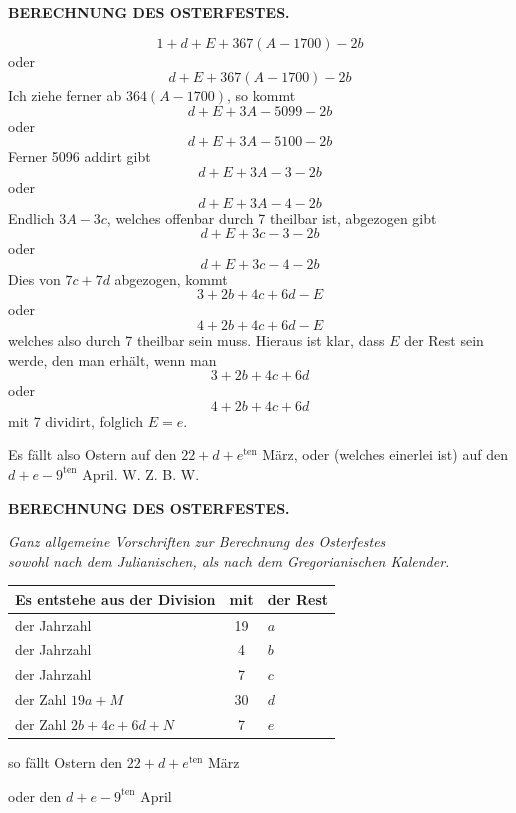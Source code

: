 \par\clearpage
\begingroup
\pagestyle{empty}
\setlength{\abovedisplayskip}{6pt plus 2pt minus 2pt}
\setlength{\belowdisplayskip}{6pt plus 2pt minus 2pt}
\setlength{\abovedisplayshortskip}{3pt plus 2pt}
\setlength{\belowdisplayshortskip}{4pt plus 2pt minus 1pt}
\thispagestyle{empty}
\noindent{}%
\makebox[12mm][l]{}%
\parbox[t]{\dimexpr\linewidth-24mm\relax}{\centering\footnotesize\bfseries BERECHNUNG DES OSTERFESTES.\par}%
\par\nobreak\medskip
\[
1+d+E+367(A-1700)-2b
\]
oder
\[
d+E+367(A-1700)-2b
\]
Ich ziehe ferner ab $364(A-1700)$, so kommt
\[
d+E+3A-5099-2b
\]
oder
\[
d+E+3A-5100-2b
\]
Ferner 5096 addirt gibt
\[
d+E+3A-3-2b
\]
oder
\[
d+E+3A-4-2b
\]
Endlich $3A-3c$, welches offenbar durch 7 theilbar ist, abgezogen gibt
\[
d+E+3c-3-2b
\]
oder
\[
d+E+3c-4-2b
\]
Dies von $7c+7d$ abgezogen, kommt
\[
3+2b+4c+6d-E
\]
oder
\[
4+2b+4c+6d-E
\]
welches also durch 7 theilbar sein muss. Hieraus ist klar, dass $E$ der Rest
sein werde, den man erhält, wenn man
\[
3+2b+4c+6d
\]
oder
\[
4+2b+4c+6d
\]
mit 7 dividirt, folglich $E=e$.

Es fällt also Ostern auf den $22+d+e^{\mathrm{ten}}$ März, oder (welches einerlei ist)
auf den $d+e-9^{\mathrm{ten}}$ April. W. Z. B. W.

\par\clearpage
\thispagestyle{empty}
\noindent{}%
%
\parbox[t]{\dimexpr\linewidth-24mm\relax}{\centering\footnotesize\bfseries BERECHNUNG DES OSTERFESTES.\par}%
\makebox[12mm][r]{}\par\nobreak\medskip
\begin{center}
\itshape Ganz allgemeine Vorschriften zur Berechnung des Osterfestes\\
sowohl nach dem Julianischen, als nach dem Gregorianischen Kalender.
\end{center}
\begin{center}
\begin{tabular}{l|c|l}
Es entstehe aus der Division & mit & der Rest\\\hline
der Jahrzahl & 19 & $a$\\
der Jahrzahl & 4 & $b$\\
der Jahrzahl & 7 & $c$\\
der Zahl $19a+M$ & 30 & $d$\\
der Zahl $2b+4c+6d+N$ & 7 & $e$\\\hline
\end{tabular}\par
so fällt Ostern den $22+d+e^{\mathrm{ten}}$ März\par
oder den $d+e-9^{\mathrm{ten}}$ April
\end{center}


